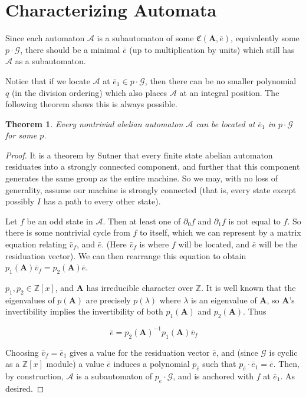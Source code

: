 \documentclass[runningheads]{llncs}
\newcommand{\A}{\mathcal{A}}
\newcommand{\G}{\mathcal{G}}
\newcommand{\C}{\mathfrak{C}(\Am,\e)}
\newcommand{\Z}{\mathbb{Z}}
\newcommand{\2}{\textbf{2}}
\newcommand{\Am}{\textbf{A}}
\newcommand{\del}{\partial}
\newcommand{\vv}{\bar{v}}
\newcommand{\e}{\bar{e}}
\newtheorem{thm}{Theorem}
\begin{document}
\section{Characterizing Automata}
Since each automaton $\A$ is a subautomaton of some $\C$,
equivalently some $p \cdot \G$, there should be a minimal $\e$ 
(up to multiplication by units) which still has $\A$ as a subautomaton. 

Notice that if we locate $\A$ at $\e_1 \in p \cdot \G$, 
then there can be no smaller polynomial $q$ (in the division ordering)
which also places $\A$ at an integral position. The following theorem 
shows this is always possible.

\begin{thm}
  Every nontrivial abelian automaton $\A$ can be 
  located at $\e_1$ in $p \cdot \G$ for some $p$.
\end{thm}

\begin{proof}
  It is a theorem by Sutner \cite{Sutner18:abelian_automata} that every 
  finite state abelian automaton residuates into a strongly connected component, 
  and further that this component generates the same group as the entire 
  machine. So we may, with no loss of generality, assume our machine is 
  strongly connected (that is, every state except possibly $I$ has a path to
  every other state).

  Let $f$ be an odd state in $\A$. Then at least one of $\del_0 f$ and 
  $\del_1 f$ is not equal to $f$. So there is some nontrivial cycle
  from $f$ to itself, which we can represent by a matrix equation 
  relating $\vv_f$, and $\e$. (Here $\vv_f$ is where $f$ will be located, 
  and $\e$ will be the residuation vector). 
  We can then rearrange this equation to obtain 
  $p_1(\Am)\vv_f = p_2(\Am)\e$.

  $p_1, p_2 \in \Z[x]$, and $\Am$ has irreducible character over $\Z$.
  It is well known that the eigenvalues of $p(\Am)$ are precisely $p(\lambda)$
  where $\lambda$ is an eigenvalue of $\Am$, so $\Am$'s invertibility implies
  the invertibility of both $p_1(\Am)$ and $p_2(\Am)$. Thus

  \[ \e = p_2(\Am)^{-1}p_1(\Am)\vv_f \]

  Choosing $\vv_f = \e_1$ gives a value for the residuation vector $\e$,
  and (since $\G$ is cyclic as a $\Z[x]$ module) a value $\e$ induces a 
  polynomial $p_{\e}$ such that $p_{\e} \cdot \e_1 = \e$. 
  Then, by construction, $\A$ is a subautomaton of $p_e \cdot \G$, and is 
  anchored with $f$ at $\e_1$. As desired.
\end{proof}
\end{document}
